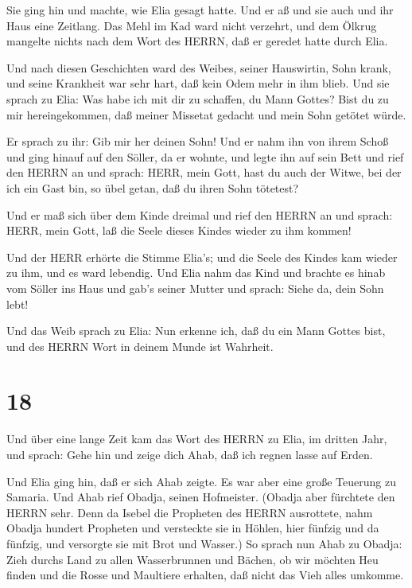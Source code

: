  Sie ging hin und machte, wie Elia gesagt hatte. Und er aß
und sie auch und ihr Haus eine Zeitlang.  Das Mehl im Kad
ward nicht verzehrt, und dem Ölkrug mangelte nichts nach dem Wort des
HERRN, daß er geredet hatte durch Elia.

 Und nach diesen Geschichten ward des Weibes, seiner
Hauswirtin, Sohn krank, und seine Krankheit war sehr hart, daß kein Odem
mehr in ihm blieb.  Und sie sprach zu Elia: Was habe ich
mit dir zu schaffen, du Mann Gottes? Bist du zu mir hereingekommen, daß
meiner Missetat gedacht und mein Sohn getötet würde.

 Er sprach zu ihr: Gib mir her deinen Sohn! Und er nahm ihn
von ihrem Schoß und ging hinauf auf den Söller, da er wohnte, und legte
ihn auf sein Bett  und rief den HERRN an und sprach: HERR,
mein Gott, hast du auch der Witwe, bei der ich ein Gast bin, so übel
getan, daß du ihren Sohn tötetest?

 Und er maß sich über dem Kinde dreimal und rief den HERRN
an und sprach: HERR, mein Gott, laß die Seele dieses Kindes wieder zu
ihm kommen!

 Und der HERR erhörte die Stimme Elia's; und die Seele des
Kindes kam wieder zu ihm, und es ward lebendig.  Und Elia
nahm das Kind und brachte es hinab vom Söller ins Haus und gab's seiner
Mutter und sprach: Siehe da, dein Sohn lebt!

 Und das Weib sprach zu Elia: Nun erkenne ich, daß du ein
Mann Gottes bist, und des HERRN Wort in deinem Munde ist Wahrheit.

\hypertarget{section-17}{%
\section{18}\label{section-17}}

 Und über eine lange Zeit kam das Wort des HERRN zu Elia, im
dritten Jahr, und sprach: Gehe hin und zeige dich Ahab, daß ich regnen
lasse auf Erden.

 Und Elia ging hin, daß er sich Ahab zeigte. Es war aber
eine große Teuerung zu Samaria.  Und Ahab rief Obadja,
seinen Hofmeister. (Obadja aber fürchtete den HERRN sehr. 
Denn da Isebel die Propheten des HERRN ausrottete, nahm Obadja hundert
Propheten und versteckte sie in Höhlen, hier fünfzig und da fünfzig, und
versorgte sie mit Brot und Wasser.)  So sprach nun Ahab zu
Obadja: Zieh durchs Land zu allen Wasserbrunnen und Bächen, ob wir
möchten Heu finden und die Rosse und Maultiere erhalten, daß nicht das
Vieh alles umkomme.

